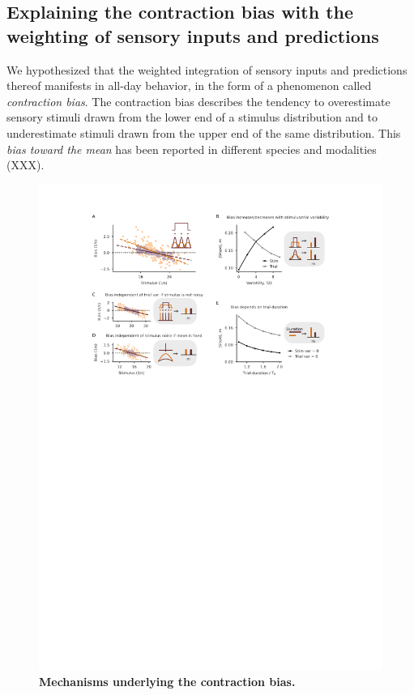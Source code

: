 \documentclass[10pt,a4paper,draft]{article}
\begin{document}
\subsection*{Explaining the contraction bias with the weighting of sensory inputs and predictions}
% 
We hypothesized that the weighted integration of sensory inputs and predictions thereof manifests in all-day behavior, in the form of a phenomenon called \textit{contraction bias}. The contraction bias describes the tendency to overestimate sensory stimuli drawn from the lower end of a stimulus distribution and to underestimate stimuli drawn from the upper end of the same distribution. This \textit{bias toward the mean} has been reported in different species and modalities (XXX). 
%
\begin{figure}[t!]
	\centering
    \includegraphics{../results/figures/final/Fig_5.pdf}
\caption{\footnotesize{\bf Mechanisms underlying the contraction bias.\newline} 
}
\end{figure}
\end{document}
